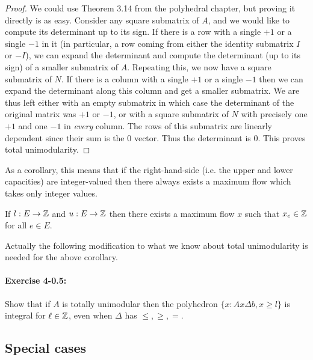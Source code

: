 \documentclass[12pt]{article}
\begin{document}
\begin{proof} We could use Theorem 3.14 from the polyhedral chapter,
but proving it directly is as easy. Consider any square submatrix of
$A$, and we would like to compute its determinant up to its sign. If
there is a row with a single $+1$ or a single $-1$ in it (in
particular, a row coming from either the identity submatrix $I$ or
$-I$), we can expand the determinant and compute the determinant (up
to its sign) of a smaller submatrix of $A$. Repeating this, we now
have a square submatrix of $N$. If there is a column with a single
$+1$ or a single $-1$ then we can expand the determinant along this
column and get a smaller submatrix. We are thus left either with an
empty submatrix in which case the determinant of the original matrix
was $+1$ or $-1$, or with a square submatrix of $N$ with precisely one
$+1$ and one $-1$ in {\it
  every} column. The rows of this submatrix are linearly dependent
since their sum is the 0 vector. Thus the determinant is 0. This
proves total unimodularity. 
\end{proof}

As a corollary, this means that if the right-hand-side (i.e. the upper
and lower capacities) are integer-valued then there always exists a
maximum flow which takes only integer values. 
\begin{corollary} \label{cor:flowint}
If $l: E\rightarrow {\mathbb Z}$ and $u:E \rightarrow {\mathbb Z}$ then there exists a
maximum flow $x$ such that $x_e\in {\mathbb Z}$ for all $e\in E$. 
\end{corollary}
Actually the following modification to what we know about total unimodularity is needed for the above corollary.
\paragraph{Exercise 4-0.5: } Show that if $A$ is totally unimodular then the polyhedron $\{x: Ax \Delta b, x \geq l\}$ is integral for $\ell \in {\mathbb Z}$, even when $\Delta$ has $\leq, \geq, =$. 


\subsection{Special cases} \label{sub:specialcases}
\end{document}
